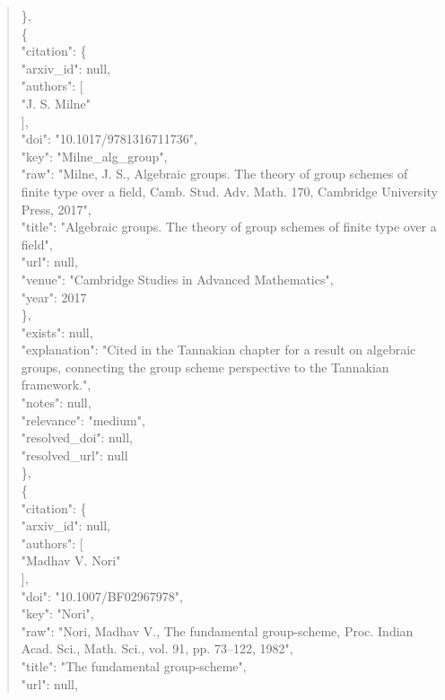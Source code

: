 \documentclass[11pt]{article}
\begin{document}
\begin{quote}
    \},\\
    \{\\
      "citation": \{\\
        "arxiv\_id": null,\\
        "authors": [\\
          "J. S. Milne"\\
        ],\\
        "doi": "10.1017/9781316711736",\\
        "key": "Milne\_alg\_group",\\
        "raw": "Milne, J. S., Algebraic groups. The theory of group schemes of finite type over a field, Camb. Stud. Adv. Math. 170, Cambridge University Press, 2017",\\
        "title": "Algebraic groups. The theory of group schemes of finite type over a field",\\
        "url": null,\\
        "venue": "Cambridge Studies in Advanced Mathematics",\\
        "year": 2017\\
      \},\\
      "exists": null,\\
      "explanation": "Cited in the Tannakian chapter for a result on algebraic groups, connecting the group scheme perspective to the Tannakian framework.",\\
      "notes": null,\\
      "relevance": "medium",\\
      "resolved\_doi": null,\\
      "resolved\_url": null\\
    \},\\
    \{\\
      "citation": \{\\
        "arxiv\_id": null,\\
        "authors": [\\
          "Madhav V. Nori"\\
        ],\\
        "doi": "10.1007/BF02967978",\\
        "key": "Nori",\\
        "raw": "Nori, Madhav V., The fundamental group-scheme, Proc. Indian Acad. Sci., Math. Sci., vol. 91, pp. 73--122, 1982",\\
        "title": "The fundamental group-scheme",\\
        "url": null,\\

\end{quote}
\end{document}
